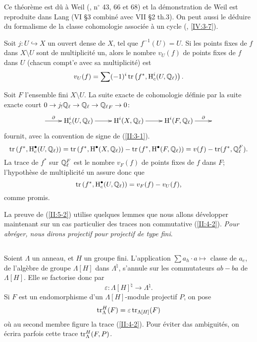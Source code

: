 Ce th\'eor\`eme est d\^u \`a Weil (\cite{we48}, n$^\circ$ 43, 66 et 68) et la 
d\'emonstration de Weil est reproduite dans Lang \cite{la83} (VI \S3 combin\'e 
avec VII \S2 th.3). On peut aussi le d\'eduire du formalisme de la classe 
cohomologie associ\'ee \`a un cycle (, \ref{IV:3-7}). 





\begin{corollary_}\label{II:5-4}
Soit $j:U\hookrightarrow X$ un ouvert dense de $X$, tel que $f^{-1}(U)=U$. Si 
les points fixes de $f$ dans $X\setminus U$ sont de multiplicit\'e un, alors le 
nombre $v_U(f)$ de points fixes de $f$ dans $U$ (chacun compt'e avec sa 
multiplicit\'e) est 
\[
  v_U(f) = \sum (-1)^i \operatorname{tr}\left(f^*,\operatorname{H}_c^i(U,\mathbb{Q}_\ell)\right) \text{.}
\]
\end{corollary_}

Soit $F$ l'ensemble fini $X\setminus U$. La suite exacte de cohomologie 
d\'efinie par la suite exacte court 
$0\to j_! \mathbb{Q}_\ell\to\mathbb{Q}_\ell\to{\mathbb{Q}_\ell}_F\to 0$: 
\[\xymatrix{
  \ar[r]^-\partial 
    & \h_c^i(U,\dQ_\ell) \ar[r] 
    & \h^i(X,\dQ_\ell) \ar[r] 
    & \h^i(F,\dQ_\ell) \ar[r]^-\partial 
    & 
}\]
fournit, avec la convention de signe de (\ref{II:3-1}). 
\[
  \operatorname{tr}\left(f^*,\operatorname{H}_c^\bullet(U,\mathbb{Q}_\ell)\right) 
    = \operatorname{tr}\left(f^*,\operatorname{H}^\bullet(X,\mathbb{Q}_\ell)\right) - \operatorname{tr}\left(f^*,\operatorname{H}^\bullet(F,\mathbb{Q}_\ell)\right) 
    = v(f) - \operatorname{tr}(f^*,\mathbb{Q}_\ell^F) \text{.}
\]
La trace de $f^*$ sur $\mathbb{Q}_\ell^F$ est le nombre $v_F(f)$ de points fixes de 
$f$ dans $F$; l'hypoth\`ese de multiplicit\'e un assure donc que 
\[
  \operatorname{tr}\left(f^*,\operatorname{H}_c^\bullet(U,\mathbb{Q}_\ell)\right) 
    = v_F(f) - v_U(f) \text{,}
\]
comme promis. 

La preuve de (\ref{II:5-2}) utilise quelques lemmes que nous allons 
d\'evelopper maintenant sur un cas particulier des traces non commutative 
(\ref{II:4-2}). \emph{Pour abr\'eger, nous dirons projectif pour projectif de 
type fini}. 





\subsection{}\label{II:5-5}

Soient $\Lambda$ un anneau, et $H$ un groupe fini. L'application 
$\sum a_h \cdot a\mapsto $ classe de $a_e$, de l'alg\`ebre de groupe 
$\Lambda[H]$ dans $\Lambda^\natural$, s'annule sur les commutateurs $ab-ba$ de 
$\Lambda[H]$. Elle se factorise donc par 
\[
  \varepsilon : \Lambda[H]^\natural \to \Lambda^\natural \text{.}
\]
Si $F$ est un endomorphisme d'un $\Lambda[H]$-module projectif $P$, on pose 
\[
  \operatorname{tr}_\Lambda^H(F) = \varepsilon \operatorname{tr}_{\Lambda[H]} (F) 
\]
o\`u au second membre figure la trace (\ref{II:4-2}). Pour \'eviter das 
ambiguit\'es, on \'ecrira parfois cette trace $\operatorname{tr}_\Lambda^H(F,P)$. 






